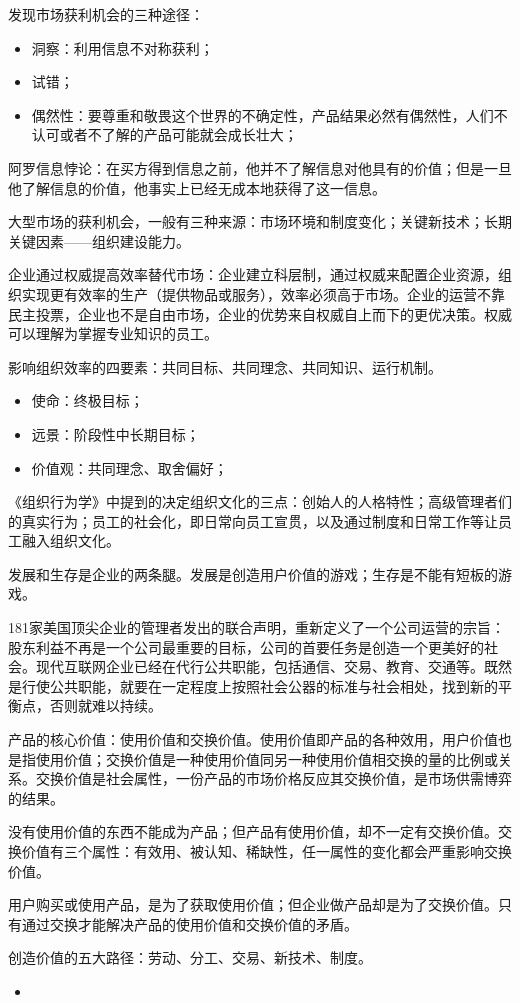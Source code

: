 \documentclass[12pt]{article}
\begin{document}
发现市场获利机会的三种途径：
\begin{itemize}
\setlength{\itemsep}{0pt}
\setlength{\parsep}{0pt}
\setlength{\parskip}{0pt}
    \item 洞察：利用信息不对称获利；
    \item 试错；
    \item 偶然性：要尊重和敬畏这个世界的不确定性，产品结果必然有偶然性，人们不认可或者不了解的产品可能就会成长壮大；
\end{itemize}

阿罗信息悖论：在买方得到信息之前，他并不了解信息对他具有的价值；但是一旦他了解信息的价值，他事实上已经无成本地获得了这一信息。

大型市场的获利机会，一般有三种来源：市场环境和制度变化；关键新技术；长期关键因素——组织建设能力。

企业通过权威提高效率替代市场：企业建立科层制，通过权威来配置企业资源，组织实现更有效率的生产（提供物品或服务），效率必须高于市场。企业的运营不靠民主投票，企业也不是自由市场，企业的优势来自权威自上而下的更优决策。权威可以理解为掌握专业知识的员工。

影响组织效率的四要素：共同目标、共同理念、共同知识、运行机制。

\begin{itemize}
\setlength{\itemsep}{0pt}
\setlength{\parsep}{0pt}
\setlength{\parskip}{0pt}
    \item 使命：终极目标；
    \item 远景：阶段性中长期目标；
    \item 价值观：共同理念、取舍偏好；
\end{itemize}

《组织行为学》中提到的决定组织文化的三点：创始人的人格特性；高级管理者们的真实行为；员工的社会化，即日常向员工宣贯，以及通过制度和日常工作等让员工融入组织文化。

发展和生存是企业的两条腿。发展是创造用户价值的游戏；生存是不能有短板的游戏。

181家美国顶尖企业的管理者发出的联合声明，重新定义了一个公司运营的宗旨：股东利益不再是一个公司最重要的目标，公司的首要任务是创造一个更美好的社会。现代互联网企业已经在代行公共职能，包括通信、交易、教育、交通等。既然是行使公共职能，就要在一定程度上按照社会公器的标准与社会相处，找到新的平衡点，否则就难以持续。

产品的核心价值：使用价值和交换价值。使用价值即产品的各种效用，用户价值也是指使用价值；交换价值是一种使用价值同另一种使用价值相交换的量的比例或关系。交换价值是社会属性，一份产品的市场价格反应其交换价值，是市场供需博弈的结果。

没有使用价值的东西不能成为产品；但产品有使用价值，却不一定有交换价值。交换价值有三个属性：有效用、被认知、稀缺性，任一属性的变化都会严重影响交换价值。

用户购买或使用产品，是为了获取使用价值；但企业做产品却是为了交换价值。只有通过交换才能解决产品的使用价值和交换价值的矛盾。

创造价值的五大路径：劳动、分工、交易、新技术、制度。
\begin{itemize}
\setlength{\itemsep}{0pt}
\setlength{\parsep}{0pt}
\setlength{\parskip}{0pt}
    \item 
\end{itemize}



\end{document}
